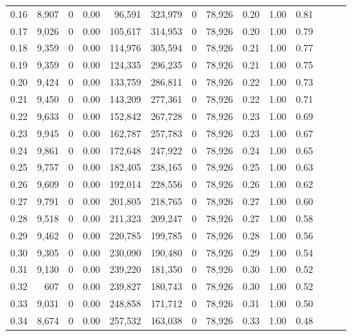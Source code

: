 \begin{tabular}{rrrrrrrrrrrrrr}
0.16 &  8,907 &      0 &  0.00 &   96,591 &  323,979 &       0 &  78,926 &  0.20 &  1.00 &      0.81 \\
0.17 &  9,026 &      0 &  0.00 &  105,617 &  314,953 &       0 &  78,926 &  0.20 &  1.00 &      0.79 \\
0.18 &  9,359 &      0 &  0.00 &  114,976 &  305,594 &       0 &  78,926 &  0.21 &  1.00 &      0.77 \\
0.19 &  9,359 &      0 &  0.00 &  124,335 &  296,235 &       0 &  78,926 &  0.21 &  1.00 &      0.75 \\
0.20 &  9,424 &      0 &  0.00 &  133,759 &  286,811 &       0 &  78,926 &  0.22 &  1.00 &      0.73 \\
0.21 &  9,450 &      0 &  0.00 &  143,209 &  277,361 &       0 &  78,926 &  0.22 &  1.00 &      0.71 \\
0.22 &  9,633 &      0 &  0.00 &  152,842 &  267,728 &       0 &  78,926 &  0.23 &  1.00 &      0.69 \\
0.23 &  9,945 &      0 &  0.00 &  162,787 &  257,783 &       0 &  78,926 &  0.23 &  1.00 &      0.67 \\
0.24 &  9,861 &      0 &  0.00 &  172,648 &  247,922 &       0 &  78,926 &  0.24 &  1.00 &      0.65 \\
0.25 &  9,757 &      0 &  0.00 &  182,405 &  238,165 &       0 &  78,926 &  0.25 &  1.00 &      0.63 \\
0.26 &  9,609 &      0 &  0.00 &  192,014 &  228,556 &       0 &  78,926 &  0.26 &  1.00 &      0.62 \\
0.27 &  9,791 &      0 &  0.00 &  201,805 &  218,765 &       0 &  78,926 &  0.27 &  1.00 &      0.60 \\
0.28 &  9,518 &      0 &  0.00 &  211,323 &  209,247 &       0 &  78,926 &  0.27 &  1.00 &      0.58 \\
0.29 &  9,462 &      0 &  0.00 &  220,785 &  199,785 &       0 &  78,926 &  0.28 &  1.00 &      0.56 \\
0.30 &  9,305 &      0 &  0.00 &  230,090 &  190,480 &       0 &  78,926 &  0.29 &  1.00 &      0.54 \\
0.31 &  9,130 &      0 &  0.00 &  239,220 &  181,350 &       0 &  78,926 &  0.30 &  1.00 &      0.52 \\
0.32 &    607 &      0 &  0.00 &  239,827 &  180,743 &       0 &  78,926 &  0.30 &  1.00 &      0.52 \\
0.33 &  9,031 &      0 &  0.00 &  248,858 &  171,712 &       0 &  78,926 &  0.31 &  1.00 &      0.50 \\
0.34 &  8,674 &      0 &  0.00 &  257,532 &  163,038 &       0 &  78,926 &  0.33 &  1.00 &      0.48 \\

\end{tabular}
